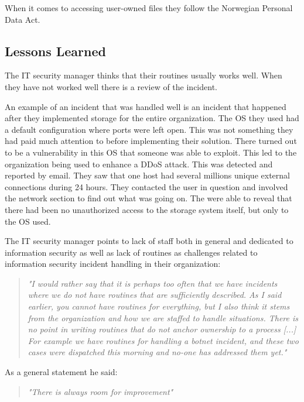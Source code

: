 When it comes to accessing user-owned files they follow the Norwegian Personal Data Act.

\subsection{Lessons Learned}
The IT security manager thinks that their routines usually works well. When they have not worked well there is a review of the incident.

An example of an incident that was handled well is an incident that happened after they implemented storage for the entire organization. The OS they used had a default configuration where ports were left open. This was not something they had paid much attention to before implementing their solution. There turned out to be a vulnerability in this OS that someone was able to exploit. This led to the organization being used to enhance a \ac{DDoS} attack. This was detected and reported by email. They saw that one host had several millions unique external connections during 24 hours. They contacted the user in question  and involved the network section to find out what was going on. The were able to reveal that there had been no unauthorized access to the storage system itself, but only to the OS used.

The IT security manager points to lack of staff  both in general and dedicated to information security as well as lack of routines as challenges related to information security incident handling in their organization: 

\begin{quote}
\textit{"I would rather say that it is perhaps too often that we have incidents where we do not have routines that are sufficiently described. %
As I said earlier, you cannot have routines for everything, but I also think it stems from the organization and how we are staffed to handle situations. There is no point in writing routines that do not anchor ownership to a process [...] For example we have routines for handling a botnet incident, and these two cases were dispatched this morning and no-one has addressed them yet."}
\end{quote}

As a general statement he said: 

\begin{quote}
\textit{"There is always room for improvement"}
\end{quote}